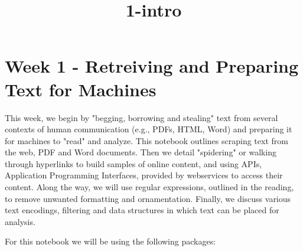 \documentclass[11pt]{article}
\title{1-intro}
\begin{document}
    
    
    \maketitle
    
    

    
    \section{Week 1 - Retreiving and Preparing Text for
Machines}\label{week-1---retreiving-and-preparing-text-for-machines}

This week, we begin by "begging, borrowing and stealing" text from
several contexts of human communication (e.g., PDFs, HTML, Word) and
preparing it for machines to "read" and analyze. This notebook outlines
scraping text from the web, PDF and Word documents. Then we detail
"spidering" or walking through hyperlinks to build samples of online
content, and using APIs, Application Programming Interfaces, provided by
webservices to access their content. Along the way, we will use regular
expressions, outlined in the reading, to remove unwanted formatting and
ornamentation. Finally, we discuss various text encodings, filtering and
data structures in which text can be placed for analysis.

For this notebook we will be using the following packages:
\end{document}

